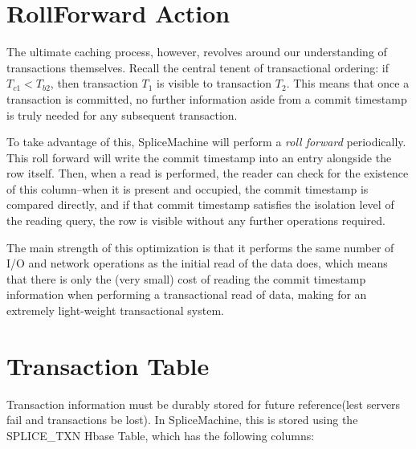 \section{RollForward Action}
The ultimate caching process, however, revolves around our understanding of transactions themselves. Recall the central tenent of transactional ordering: if $T_{c1} < T_{b2}$, then transaction $T_1$ is visible to transaction $T_2$. This means that once a transaction is committed, no further information aside from a commit timestamp is truly needed for any subsequent transaction. 

To take advantage of this, SpliceMachine will perform a \emph{roll forward} periodically. This roll forward will write the commit timestamp into an entry alongside the row itself. Then, when a read is performed, the reader can check for the existence of this column--when it is present and occupied, the commit timestamp is compared directly, and if that commit timestamp satisfies the isolation level of the reading query, the row is visible without any further operations required.

The main strength of this optimization is that it performs the same number of I/O and network operations as the initial read of the data does, which means that there is only the (very small) cost of reading the commit timestamp information when performing a transactional read of data, making for an extremely light-weight transactional system.

\section{Transaction Table}
Transaction information must be durably stored for future reference(lest servers fail and transactions be lost). In SpliceMachine, this is stored using the SPLICE\_TXN Hbase Table, which has the following columns:

